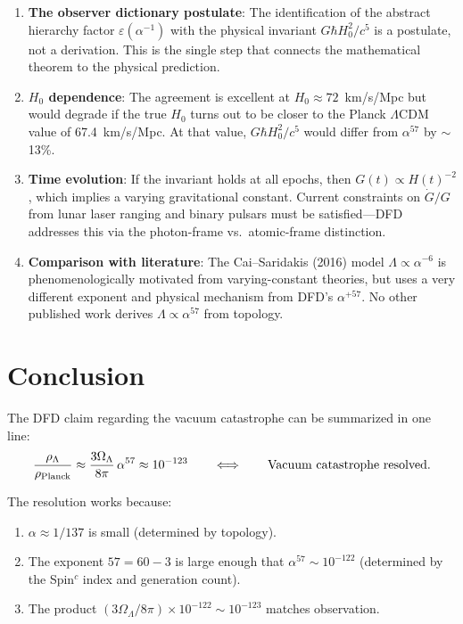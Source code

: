 \documentclass[11pt]{article}
\begin{document}
\begin{enumerate}
\item \textbf{The observer dictionary postulate}: The identification of the abstract
hierarchy factor $\varepsilon(\alpha^{-1})$ with the physical invariant $G\hbar H_0^2/c^5$
is a postulate, not a derivation. This is the single step that connects the mathematical
theorem to the physical prediction.

\item \textbf{$H_0$ dependence}: The agreement is excellent at $H_0 \approx 72$~km/s/Mpc
but would degrade if the true $H_0$ turns out to be closer to the Planck
$\Lambda$CDM value of 67.4~km/s/Mpc. At that value, $G\hbar H_0^2/c^5$ would differ
from $\alpha^{57}$ by $\sim$13\%.

\item \textbf{Time evolution}: If the invariant holds at all epochs, then $G(t) \propto H(t)^{-2}$,
which implies a varying gravitational constant. Current constraints on $\dot{G}/G$ from
lunar laser ranging and binary pulsars must be satisfied---DFD addresses this via the
photon-frame vs.\ atomic-frame distinction.

\item \textbf{Comparison with literature}: The Cai--Saridakis (2016) model
$\Lambda \propto \alpha^{-6}$ is phenomenologically motivated from varying-constant theories,
but uses a very different exponent and physical mechanism from DFD's $\alpha^{+57}$.
No other published work derives $\Lambda \propto \alpha^{57}$ from topology.
\end{enumerate}

\section{Conclusion}

The DFD claim regarding the vacuum catastrophe can be summarized in one line:
\begin{equation}
\frac{\rho_\Lambda}{\rho_{\rm Planck}} \approx \frac{3\Omega_\Lambda}{8\pi}\,\alpha^{57}
\approx 10^{-123}
\qquad \Longleftrightarrow \qquad
\text{Vacuum catastrophe resolved.}
\end{equation}

The resolution works because:
\begin{enumerate}
\item $\alpha \approx 1/137$ is small (determined by topology).
\item The exponent $57 = 60 - 3$ is large enough that $\alpha^{57} \sim 10^{-122}$
(determined by the Spin$^c$ index and generation count).
\item The product $(3\Omega_\Lambda/8\pi) \times 10^{-122} \sim 10^{-123}$ matches observation.
\end{enumerate}
\end{document}
